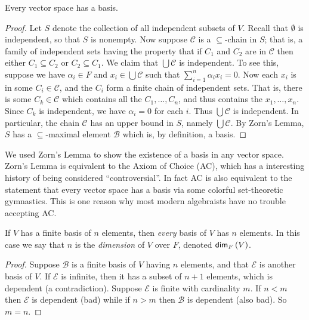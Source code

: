 \documentclass{memoir}
\begin{document}
\begin{prp}
Every vector space has a basis.
\end{prp}

\begin{proof}
Let $S$ denote the collection of all independent subsets of $V$. Recall that $\emptyset$ is independent, so that $S$ is nonempty. Now suppose $\mathcal{C}$ is a $\subseteq$-chain in $S$; that is, a family of independent sets having the property that if $C_1$ and $C_2$ are in $\mathcal{C}$ then either $C_1 \subseteq C_2$ or $C_2 \subseteq C_1$. We claim that $\bigcup \mathcal{C}$ is independent. To see this, suppose we have $\alpha_i \in F$ and $x_i \in \bigcup \mathcal{C}$ such that $\sum_{i=1}^n \alpha_i x_i = 0$. Now each $x_i$ is in some $C_i \in \mathcal{C}$, and the $C_i$ form a finite chain of independent sets. That is, there is some $C_k \in \mathcal{C}$ which contains all the $C_1,\ldots,C_n$, and thus contains the $x_1,\ldots,x_n$. Since $C_k$ is independent, we have $\alpha_i = 0$ for each $i$. Thus $\bigcup \mathcal{C}$ is independent. In particular, the chain $\mathcal{C}$ has an upper bound in $S$, namely $\bigcup \mathcal{C}$. By Zorn's Lemma, $S$ has a $\subseteq$-maximal element $\mathcal{B}$ which is, by definition, a basis.
\end{proof}

We used Zorn's Lemma to show the existence of a basis in any vector space. Zorn's Lemma is equivalent to the Axiom of Choice (AC), which has a interesting history of being considered ``controversial''. In fact AC is also equivalent to the statement that every vector space has a basis via some colorful set-theoretic gymnastics. This is one reason why most modern algebraists have no trouble accepting AC.

\begin{prp}
If $V$ has a finite basis of $n$ elements, then \emph{every} basis of $V$ has $n$ elements. In this case we say that $n$ is the \emph{dimension} of $V$ over $F$, denoted $\Dim[F]{V}$.
\end{prp}

\begin{proof}
Suppose $\mathcal{B}$ is a finite basis of $V$ having $n$ elements, and that $\mathcal{E}$ is another basis of $V$. If $\mathcal{E}$ is infinite, then it has a subset of $n+1$ elements, which is dependent (a contradiction). Suppose $\mathcal{E}$ is finite with cardinality $m$. If $n < m$ then $\mathcal{E}$ is dependent (bad) while if $n > m$ then $\mathcal{B}$ is dependent (also bad). So $m = n$.
\end{proof}
\end{document}
